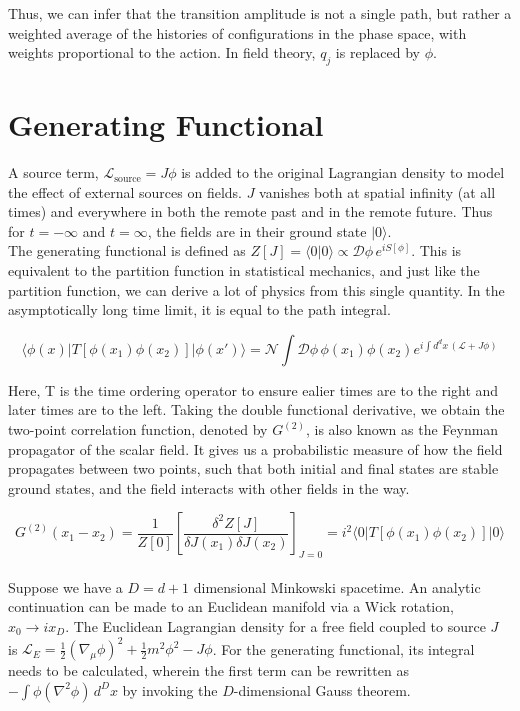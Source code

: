 \noindent Thus, we can infer that the transition amplitude is not a single path, but rather a weighted average of the histories of configurations in the phase space, with weights proportional to the action. In field theory, $q_j$ is replaced by $\phi$.

\section{Generating Functional}
A source term, $\mathcal{L}_\text{source}=J\phi$ is added to the original Lagrangian density to model the effect of external sources on fields. $J$ vanishes both at spatial infinity (at all times) and everywhere in both the remote past and in the remote future. Thus for $t=-\infty$ and $t=\infty$, the fields are in their ground state $|0\rangle$.\\

\noindent The generating functional is defined as $Z[J]=\langle 0|0\rangle \propto\mathcal{D}\phi\,e^{iS[\phi]}$. This is equivalent to the partition function in statistical mechanics, and just like the partition function, we can derive a lot of physics from this single quantity. In the asymptotically long time limit, it is equal to the path integral.

$$\langle\phi(x)|T[\phi(x_1)\phi(x_2)]|\phi(x')\rangle=\mathcal{N}\int\mathcal{D}\phi\,\phi(x_1)\phi(x_2)e^{i\int d^dx\,(\mathcal{L}+J\phi)}$$

\noindent Here, T is the time ordering operator to ensure ealier times are to the right and later times are to the left. Taking the double functional derivative, we obtain the two-point correlation function, denoted by $G^{(2)}$, is also known as the Feynman propagator of the scalar field. It gives us a probabilistic measure of how the field propagates between two points, such that both initial and final states are stable ground states, and the field interacts with other fields in the way.

$$G^{(2)}(x_1-x_2)=\frac{1}{Z[0]}\left[\frac{\delta^2 Z[J]}{\delta J(x_1)\delta J(x_2)}\right]_{J=0}=i^2 \langle 0|T[\phi(x_1)\phi(x_2)]|0\rangle$$\\

\noindent Suppose we have a $D=d+1$ dimensional Minkowski spacetime. An analytic continuation can be made to an Euclidean manifold via a Wick rotation, $x_0\rightarrow ix_D$. The Euclidean Lagrangian density for a free field coupled to source $J$ is $\mathcal{L}_E=\frac{1}{2}(\nabla_\mu\phi)^2+\frac{1}{2}m^2\phi^2-J\phi$. For the generating functional, its integral needs to be calculated, wherein the first term can be rewritten as $-\int\phi(\nabla^2\phi)\,d^Dx$ by invoking the $D$-dimensional Gauss theorem.

